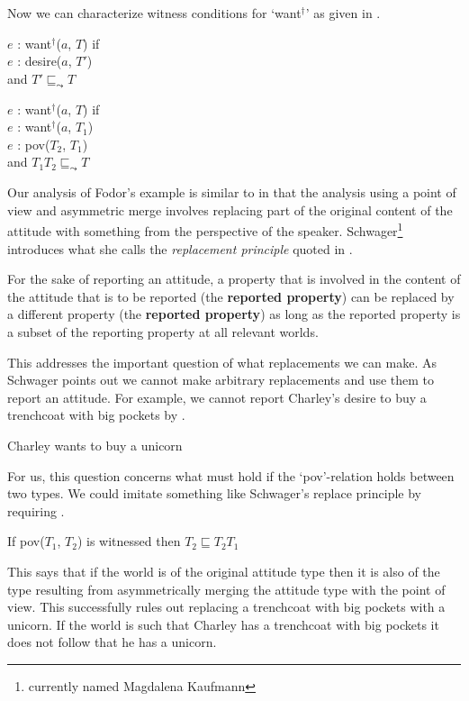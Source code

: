 Now we can characterize witness conditions for `want$^{\dagger}$' as
given in \nexteg{}.
\begin{ex} 
$e$ : want$^{\dagger}$($a$, $T$) if\\
\hspace*{2em} $e$ : desire($a$, $T'$) \\
\hspace*{2em} and $T'\sqsubseteq_{\leadsto}T$

$e$ : want$^{\dagger}$($a$, $T$) if\\
\hspace*{2em} $e$ : want$^{\dagger}$($a$, $T_1$)\\
\hspace*{2em} $e$ : pov($T_2$, $T_1$) \\
\hspace*{2em} and $T_1$\fbox{\d{$\wedge$}}$T_2 \sqsubseteq_{\leadsto}T$
\end{ex} 
      
Our analysis of Fodor's example is similar to \cite{Schwager2009} in
that the analysis using a point of view and asymmetric merge involves
replacing part of the original content of the attitude with something
from the perspective of the speaker.  Schwager\footnote{currently
  named Magdalena Kaufmann} introduces what she calls the
\textit{replacement principle} quoted in \nexteg{}.
\begin{ex} 
For the sake of reporting an attitude, a property that is involved in
the content of the attitude that is to be reported (the
\textbf{reported property}) can be replaced by a different property
(the \textbf{reported property}) as long as the reported property is a
subset of the reporting property at all relevant worlds. 

\hfill\cite[p. 409]{Schwager2009} 
\end{ex} 
This addresses the important question of what replacements we can
make.  As Schwager points out we cannot make arbitrary replacements
and use them to report an attitude.  For example, we cannot report
Charley's desire to buy a trenchcoat with big pockets by \nexteg{}.
\begin{ex} 
Charley wants to buy a unicorn 
\end{ex} 
For us, this question concerns what must hold if the `pov'-relation
holds between two types.  We could imitate something like Schwager's
replace principle by requiring \nexteg{}.
\begin{ex} 
If pov($T_1$, $T_2$) is witnessed then $T_2\sqsubseteq T_2$\fbox{\d{$\wedge$}}$T_1$ 
\end{ex} 
This says that if the world is of the original attitude type then it
is also of the type resulting from asymmetrically merging the attitude
type with the point of view.  This successfully rules out replacing a
trenchcoat with big pockets with a unicorn.  If the world is such that
Charley has a trenchcoat with big pockets it does not follow that he
has a unicorn.

